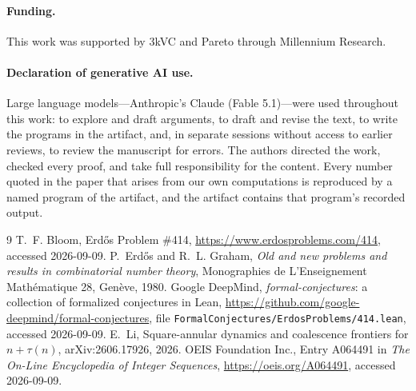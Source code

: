 \documentclass[11pt]{article}
\theoremstyle{plain}
\theoremstyle{definition}
\begin{document}
\paragraph{Funding.} This work was supported by 3kVC and Pareto through Millennium Research.

\paragraph{Declaration of generative AI use.}
Large language models---Anthropic's Claude (Fable 5.1)---were used throughout this work:
to explore and draft arguments, to draft and revise the text, to
write the programs in the artifact, and, in separate sessions
without access to earlier reviews, to review the manuscript for
errors.  The authors directed the work, checked every proof, and
take full responsibility for the content.  Every number quoted in
the paper that arises from our own computations is reproduced by
a named program of the artifact, and the artifact contains that
program's recorded output.

\begin{thebibliography}{9}
 T.~F. Bloom, Erd\H{o}s Problem \#414, \url{https://www.erdosproblems.com/414}, accessed 2026-09-09.
 P.~Erd\H{o}s and R.~L. Graham, \emph{Old and new problems and results in combinatorial number theory}, Monographies de L'Enseignement Math\'ematique 28, Gen\`eve, 1980.
 Google DeepMind, \emph{formal-conjectures}: a collection of formalized conjectures in Lean, \url{https://github.com/google-deepmind/formal-conjectures}, file \texttt{FormalConjectures/ErdosProblems/414.lean}, accessed 2026-09-09.
 E.~Li, Square-annular dynamics and coalescence frontiers for $n+\tau(n)$, arXiv:2606.17926, 2026.
 OEIS Foundation Inc., Entry A064491 in \emph{The On-Line Encyclopedia of Integer Sequences}, \url{https://oeis.org/A064491}, accessed 2026-09-09.
\end{thebibliography}
\end{document}

